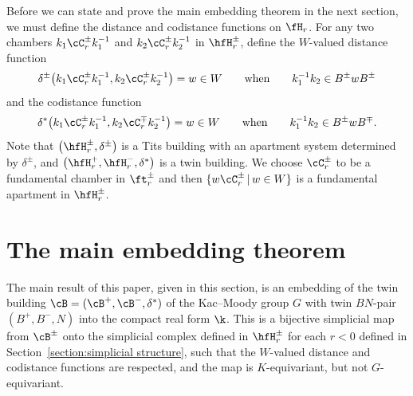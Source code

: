 Before we can state and prove the main embedding theorem in the next section, we must define the distance and codistance functions on $\fH_r$. For any two chambers $k_1 \cC_r^\pm k_1^{-1}$ and $k_2 \cC_r^\pm k_2^{-1}$ in $\hfH_{r}^\pm$, define the $W$-valued distance function
\[\delta^\pm\big(k_1 \cC_r^\pm k_1^{-1}, k_2 \cC_r^\pm k_2^{-1}\big) = w \in W\qquad\hbox{when}\qquad k_1^{-1} k_2\in B^\pm w B^\pm\]
and the codistance function
\[\delta^*\big(k_1 \cC_r^\pm k_1^{-1}, k_2 \cC_r^\mp k_2^{-1}\big) = w \in W\qquad\hbox{when}\qquad k_1^{-1} k_2\in B^\pm w B^\mp.\]
Note that $\big(\hfH_r^\pm,\delta^\pm\big)$ is a Tits building with an apartment system determined by $\delta^\pm$, and \linebreak $\big(\hfH_r^+,\hfH_r^-,\delta^*\big)$ is a twin building. We choose $\cC_r^\pm$ to be a fundamental chamber in $\ft_r^\pm$ and then $\{w\cC_r^\pm\,|\, w\in W\}$ is a fundamental apartment in $\hfH_r^\pm$.

\section{The main embedding theorem}

The main result of this paper, given in this section, is an embedding of the twin building $\cB=(\cB^+, \cB^-,\delta^*)$ of the Kac--Moody
group $G$ with twin $BN$-pair $(B^+,B^-,N)$ into the compact real form $\k$. This is a bijective simplicial map from $\cB^\pm$ onto the simplicial complex defined in $\hfH_{r}^\pm$ for each $r < 0$ defined in Section~\ref{section:simplicial structure}, such that the
$W$-valued distance and codistance functions are respected, and the map is $K$-equivariant, but not $G$-equivariant.

